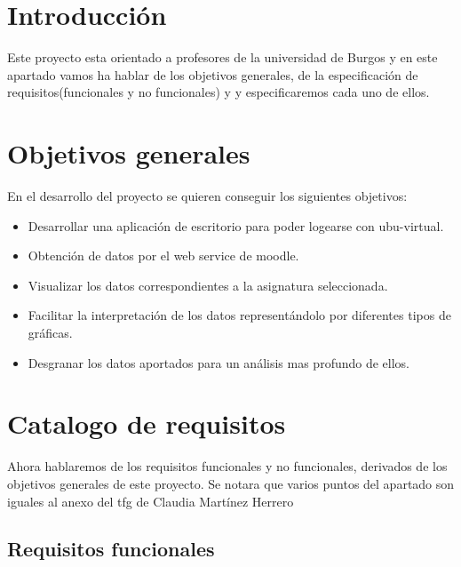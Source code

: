 
\section{Introducción}

Este proyecto esta orientado a profesores de la universidad de Burgos y en este apartado vamos ha hablar de los objetivos generales, de la especificación de requisitos(funcionales y no funcionales) y y especificaremos cada uno de ellos.

\section{Objetivos generales}

En el desarrollo del proyecto se quieren conseguir los siguientes objetivos:

\begin{itemize}
	\tightlist
	\item
	Desarrollar una aplicación de escritorio para poder logearse con ubu-virtual.
	\item
	Obtención de datos por el web service de moodle.
	\item
	Visualizar los datos correspondientes a la asignatura seleccionada.
	\item
	Facilitar la interpretación de los datos representándolo por diferentes tipos de gráficas.
	\item
	Desgranar los datos aportados para un análisis mas profundo de ellos.
\end{itemize}

\section{Catalogo de requisitos}

Ahora hablaremos de los requisitos funcionales y no funcionales, derivados de los objetivos generales de este proyecto. Se notara que varios puntos del apartado son iguales al anexo del tfg de Claudia Martínez Herrero \cite{claudia:anexo}

\subsection{Requisitos funcionales}\label{requisitos-funcionales}

